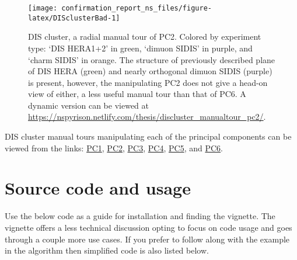 \documentclass{monashthesis}
\begin{document}
\begin{figure}

{\centering \texttt{[image: confirmation\_report\_ns\_files/figure-latex/DISclusterBad-1]} 

}

\caption{DIS cluster, a radial manual tour of PC2.
Colored by experiment type: `DIS HERA1+2' in green, `dimuon SIDIS' in
purple, and `charm SIDIS' in orange. The structure of previously
described plane of DIS HERA (green) and nearly orthogonal dimuon SIDIS
(purple) is present, however, the manipulating PC2 does not give a
head-on view of either, a less useful manual tour than that of PC6. A
dynamic version can be viewed at
\url{https://nspyrison.netlify.com/thesis/discluster_manualtour_pc2/}.}\label{fig:DISclusterBad}
\end{figure}

DIS cluster manual tours manipulating each of the principal components
can be viewed from the links:
\href{https://nspyrison.netlify.com/thesis/discluster_manualtour_pc1/}{PC1},
\href{https://nspyrison.netlify.com/thesis/discluster_manualtour_pc2/}{PC2},
\href{https://nspyrison.netlify.com/thesis/discluster_manualtour_pc3/}{PC3},
\href{https://nspyrison.netlify.com/thesis/discluster_manualtour_pc4/}{PC4},
\href{https://nspyrison.netlify.com/thesis/discluster_manualtour_pc5/}{PC5},
and
\href{https://nspyrison.netlify.com/thesis/discluster_manualtour_pc6/}{PC6}.

\section{Source code and usage}\label{sec:usage}

Use the below code as a guide for installation and finding the vignette.
The vignette offers a less technical discussion opting to focus on code
usage and goes through a couple more use cases. If you prefer to follow
along with the example in the algorithm then simplified code is also
listed below.
\end{document}
